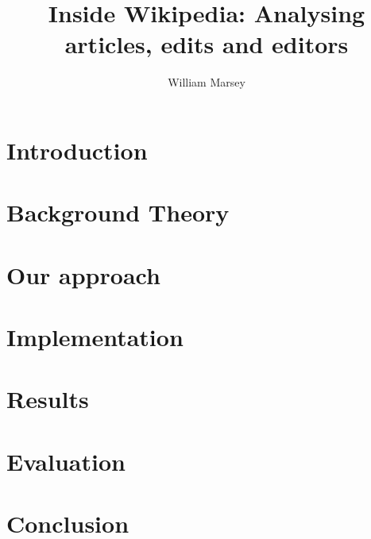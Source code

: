 \documentclass[a4paper,11pt,twoside]{report}
\begin{document}
\title{\LARGE {\bf Inside Wikipedia: Analysing articles, edits and editors}\\
 \vspace*{6mm}
}

\author{William Marsey}

\normallinespacing
\maketitle

\preface



\body
\chapter{Introduction}
\label{ch:introduction}


\chapter{Background Theory}
\label{ch:background}




\chapter{Our approach}



\chapter{Implementation}
\label{ch:implementation}




\chapter{Results}
\label{ch:results}




\chapter{Evaluation}
\label{ch:evaluation}




\chapter{Conclusion}
\label{ch:conclusions}




\appendix


\printbibliography        
\end{document}
